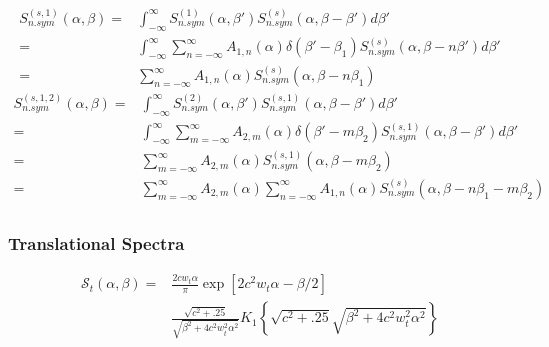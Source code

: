 \documentclass[../master.tex]{subfiles}
\begin{document}
                                \begin{align}
                                  S^{(s,1)}_{n.sym}(\alpha,\beta)=&\int_{-\infty}^{\infty}S^{(1)}_{n.sym}\left(\alpha,\beta'\right)S^{(s)}_{n.sym}\left(\alpha,\beta-\beta'\right)d\beta'\\
                                  =&\int_{-\infty}^{\infty}\sum_{n=-\infty}^{\infty}A_{1,n}(\alpha)\delta\left(\beta'-\beta_1\right)S^{(s)}_{n.sym}\left(\alpha,\beta-n\beta'\right)d\beta'\\
                                  =&\sum_{n=-\infty}^{\infty}A_{1,n}(\alpha)S^{(s)}_{n.sym}\left(\alpha,\beta-n\beta_1\right)
                                \end{align}
                                \begin{align}
                                  S^{(s,1,2)}_{n.sym}(\alpha,\beta)=&\int_{-\infty}^{\infty}S^{(2)}_{n.sym}\left(\alpha,\beta'\right)S^{(s,1)}_{n.sym}\left(\alpha,\beta-\beta'\right)d\beta'\\
                                  =&\int_{-\infty}^{\infty}\sum_{m=-\infty}^{\infty}A_{2,m}(\alpha)\delta\left(\beta'-m\beta_2\right)S^{(s,1)}_{n.sym}\left(\alpha,\beta-\beta'\right)d\beta'\\
                                  =&\sum_{m=-\infty}^{\infty}A_{2,m}(\alpha)S^{(s,1)}_{n.sym}\left(\alpha,\beta-m\beta_2\right)\\
                                  =&\sum_{m=-\infty}^{\infty}A_{2,m}(\alpha)\sum_{n=-\infty}^{\infty}A_{1,n}(\alpha)S^{(s)}_{n.sym}\left(\alpha,\beta-n\beta_1-m\beta_2\right)
\\
                                \end{align}





			
			\subsubsection{Translational Spectra}

                            \begin{align}
                                \mathcal{S}_{t}(\alpha,\beta)=&\frac{2cw_{t}\alpha}{\pi}\exp\left[2c^{2}w_{t}\alpha-\beta/2\right]\\
                                &\frac{\sqrt{c^{2}+.25}}{\sqrt{\beta^{2}+4c^{2}w_{t}^{2}\alpha^{2}}}K_{1}\left\{\sqrt{c^{2}+.25}\sqrt{\beta^{2}+4c^{2}w_{t}^{2}\alpha^{2}}\right\}
                            \end{align}
\end{document}

